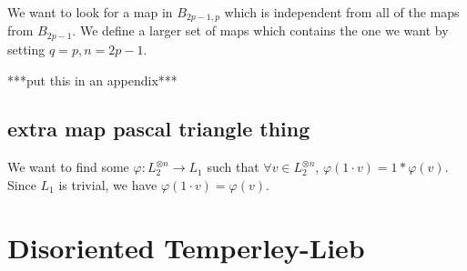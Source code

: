 \documentclass[11pt]{article} %
\begin{document}
We want to look for a map in $B_{2p-1,p}$ which is independent from all of the maps from $B_{2p-1}$. We define a larger set of maps which contains the one we want by setting $q=p,n=2p-1$.

***put this in an appendix***




\subsection{extra map pascal triangle thing}

We want to find some $\varphi:L_2^{\otimes n} \rightarrow L_1$ such that $\forall v \in L_2^{\otimes n}$, $\varphi(1 \cdot v) = 1 \ast \varphi(v)$. Since $L_1$ is trivial, we have $\varphi(1 \cdot v) = \varphi(v)$.




\section{Disoriented Temperley-Lieb}

\fi
\end{document}
